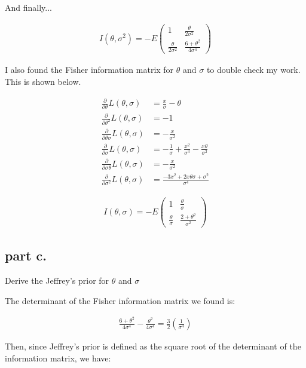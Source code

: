 \documentclass[12pt,a4paper]{article}
\begin{document}
And finally...

\begin{align*}
	I(\theta, \sigma^2) = -E
		\begin{pmatrix}
			1 & \frac{\theta}{2\sigma^2} \\
			\frac{\theta}{2\sigma^2} & \frac{6 + \theta^2}{4 \sigma^4}
		\end{pmatrix}	
\end{align*}

I also found the Fisher information matrix for $\theta$ and $\sigma$ to double check my work.
This is shown below.

\begin{align*}
	\frac{\partial}{\partial \theta} L(\theta, \sigma) &= \frac{x}{\sigma} - \theta \\
	\frac{\partial}{\partial \theta^2} L(\theta, \sigma) &= -1 \\
	\frac{\partial}{\partial \theta \sigma} L(\theta, \sigma)&= -\frac{x}{\sigma^2} \\
	\frac{\partial}{\partial \sigma} L(\theta, \sigma) &= -\frac{1}{\sigma} + \frac{x^2}{\sigma^3} - \frac{x\theta}{\sigma^2} \\
	\frac{\partial}{\partial \sigma \theta} L(\theta, \sigma) &= -\frac{x}{\sigma^2} \\
	\frac{\partial}{\partial \sigma^2} L(\theta, \sigma) &= \frac{-3x^2 + 2x\theta\sigma+ \sigma^2}{\sigma^4}
\end{align*}

\begin{align*}
	I(\theta, \sigma) = -E
		\begin{pmatrix}
			1 & \frac{\theta}{\sigma} \\
			\frac{\theta}{\sigma} & \frac{2 + \theta^2}{\sigma^2}
		\end{pmatrix}	
\end{align*}

\subsection{part c.}
Derive the Jeffrey's prior for $\theta$ and $\sigma$

The determinant of the Fisher information matrix we found is:

\begin{align*}
	\frac{6 + \theta^2}{4\sigma^4} - \frac{\theta^2}{4\sigma^4} = \frac{3}{2} \left(\frac{1}{\sigma^4}\right)
\end{align*}

Then, since Jeffrey's prior is defined as the square root of the determinant of the information matrix, we have:
\end{document}
